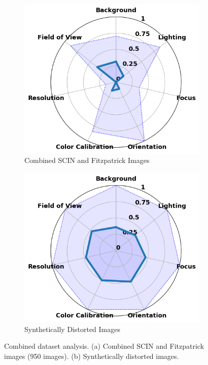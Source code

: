 \begin{figure}[ht]
    \centering
    \begin{subfigure}[b]{0.48\textwidth}
        \includegraphics[width=\textwidth]{img/hept/combined.png}
        \caption{Combined SCIN and Fitzpatrick Images}
        \label{fig:combined}
    \end{subfigure}
    \hfill
    \begin{subfigure}[b]{0.48\textwidth}
        \includegraphics[width=\textwidth]{img/hept/comb_synthetic.png}
        \caption{Synthetically Distorted Images}
        \label{fig:comb_synthetic}
    \end{subfigure}
    \hfill
    \caption{Combined dataset analysis. (a) Combined SCIN and Fitzpatrick images (950 images). (b) Synthetically distorted images.}
    \label{fig:CF}
\end{figure}
\clearpage
